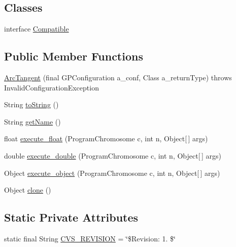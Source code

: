 \subsection*{Classes}
\begin{DoxyCompactItemize}
\item 
interface \hyperlink{interfaceorg_1_1jgap_1_1gp_1_1function_1_1_arc_tangent_1_1_compatible}{Compatible}
\end{DoxyCompactItemize}
\subsection*{Public Member Functions}
\begin{DoxyCompactItemize}
\item 
\hyperlink{classorg_1_1jgap_1_1gp_1_1function_1_1_arc_tangent_a5110ad35bb07c1c38bbb93f3f8127f99}{Arc\-Tangent} (final G\-P\-Configuration a\-\_\-conf, Class a\-\_\-return\-Type)  throws Invalid\-Configuration\-Exception 
\item 
String \hyperlink{classorg_1_1jgap_1_1gp_1_1function_1_1_arc_tangent_ac95528133e0b3622d28e3c6ec52249e9}{to\-String} ()
\item 
String \hyperlink{classorg_1_1jgap_1_1gp_1_1function_1_1_arc_tangent_a2305bed813095fb0d513b091dd5093cb}{get\-Name} ()
\item 
float \hyperlink{classorg_1_1jgap_1_1gp_1_1function_1_1_arc_tangent_ab2196a273ef1bc366fe7275620d8d5f4}{execute\-\_\-float} (Program\-Chromosome c, int n, Object\mbox{[}$\,$\mbox{]} args)
\item 
double \hyperlink{classorg_1_1jgap_1_1gp_1_1function_1_1_arc_tangent_aac5d652cdcb4f78919bfd91b607a9909}{execute\-\_\-double} (Program\-Chromosome c, int n, Object\mbox{[}$\,$\mbox{]} args)
\item 
Object \hyperlink{classorg_1_1jgap_1_1gp_1_1function_1_1_arc_tangent_a2840ea55609eaf6cec907bb83d26a235}{execute\-\_\-object} (Program\-Chromosome c, int n, Object\mbox{[}$\,$\mbox{]} args)
\item 
Object \hyperlink{classorg_1_1jgap_1_1gp_1_1function_1_1_arc_tangent_a34d31b13939e26c7b5bff5320c2a32f9}{clone} ()
\end{DoxyCompactItemize}
\subsection*{Static Private Attributes}
\begin{DoxyCompactItemize}
\item 
static final String \hyperlink{classorg_1_1jgap_1_1gp_1_1function_1_1_arc_tangent_a6745bcec6afdb58c2b993658c97100b7}{C\-V\-S\-\_\-\-R\-E\-V\-I\-S\-I\-O\-N} = \char`\"{}\$Revision\-: 1. \$\char`\"{}
\end{DoxyCompactItemize}
